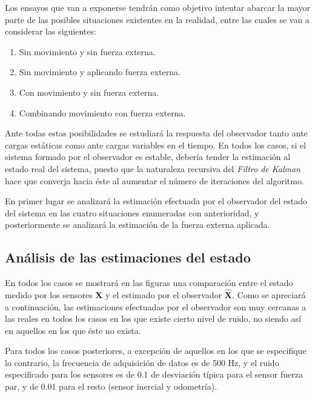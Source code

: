 Los ensayos que van a exponerse tendrán como objetivo intentar abarcar la mayor parte de las posibles situaciones existentes en la realidad, entre las cuales se van a considerar las siguientes:

\begin{enumerate}
\item Sin movimiento y sin fuerza externa.
\item Sin movimiento y aplicando fuerza externa.
\item Con movimiento y sin fuerza externa.
\item Combinando movimiento con fuerza externa.
\end{enumerate}

Ante todas estas posibilidades se estudiará la respuesta del observador tanto ante cargas estáticas como ante cargas variables en el tiempo. En todos los casos, si el sistema formado por el observador es estable, debería tender la estimación al estado real del sistema, puesto que la naturaleza recursiva del \emph{Filtro de Kalman} hace que converja hacia éste al aumentar el número de iteraciones del algoritmo. \par 

En primer lugar se analizará la estimación efectuada por el observador del estado del sistema en las cuatro situaciones enumeradas con anterioridad, y posteriormente se analizará la estimación de la fuerza externa aplicada. \par 

\subsection{Análisis de las estimaciones del estado}

En todos los casos se mostrará en las figuras una comparación entre el estado medido por los sensores $\boldsymbol{X}$ y el estimado por el observador $\boldsymbol{\hat{X}}$. Como se apreciará a continuación, las estimaciones efectuadas por el observador son muy cercanas a las reales en todos los casos en los que existe cierto nivel de ruido, no siendo así en aquellos en los que éste no exista. \par 

Para todos los casos posteriores, a excepción de aquellos en los que se especifique lo contrario, la frecuencia de adquisición de datos es de 500 Hz, y el ruido especificado para los sensores es de 0.1 de desviación típica para el sensor fuerza par, y de 0.01 para el resto (sensor inercial y odometría). \par 

